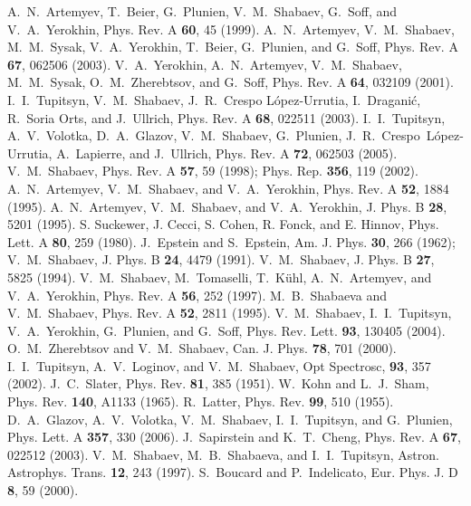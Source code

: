 \documentclass[preprint,aps,pra,showpacs,floatfix]{revtex4}
\begin{document}
\begin{thebibliography}{99}
A.~N.~Artemyev, T.~Beier, G.~Plunien, V.~M.~Shabaev, G.~Soff, and V.~A.~Yerokhin,
Phys. Rev. A \textbf{60}, 45 (1999).
%
A.~N.~Artemyev, V.~M.~Shabaev, M.~M.~Sysak, V.~A.~Yerokhin, T.~Beier, G.~Plunien,
and G.~Soff,
Phys. Rev. A \textbf{67}, 062506 (2003).
%
V.~A.~Yerokhin, A.~N.~Artemyev, V.~M.~Shabaev, M.~M.~Sysak, O.~M.~Zherebtsov,
and G.~Soff,
Phys. Rev. A \textbf{64}, 032109 (2001).
%
I.~I.~Tupitsyn, V.~M.~Shabaev, J.~R.~Crespo L\'opez-Urrutia, I.~Dragani\'c, R.~Soria Orts, and J.~Ullrich,
Phys. Rev. A {\bf 68}, 022511 (2003).
%
I.~I.~Tupitsyn, A.~V.~Volotka, D.~A.~Glazov, V.~M.~Shabaev, G.~Plunien,
J.~R.~Crespo~L\'opez-Urrutia, A.~Lapierre, and J.~Ullrich,
Phys. Rev. A {\bf 72}, 062503 (2005).
%
V.~M.~Shabaev,
Phys. Rev. A {\bf 57}, 59 (1998); Phys. Rep. {\bf 356}, 119 (2002).
%
A.~N.~Artemyev, V.~M.~Shabaev, and V.~A.~Yerokhin,
Phys. Rev. A {\bf 52}, 1884 (1995).
%
A.~N.~Artemyev, V.~M.~Shabaev, and V.~A.~Yerokhin,
J. Phys. B \textbf{28}, 5201 (1995).
%
S. Suckewer, J. Cecci, S. Cohen, R. Fonck, and E. Hinnov,
Phys. Lett. A {\bf 80}, 259 (1980).
%
J.~Epstein and S.~Epstein,
Am. J. Phys.  {\bf 30}, 266 (1962);
V.~M.~Shabaev,
J. Phys. B {\bf 24}, 4479 (1991).
%
V.~M.~Shabaev,
J. Phys. B {\bf 27}, 5825 (1994).
%
V.~M.~Shabaev, M.~Tomaselli, T.~K\"{u}hl, A.~N.~Artemyev, and V.~A.~Yerokhin,
Phys. Rev. A {\bf 56}, 252 (1997).
%
M.~B.~Shabaeva and V.~M.~Shabaev,
Phys. Rev. A {\bf 52}, 2811 (1995).
%
V.~M.~Shabaev, I.~I.~Tupitsyn, V.~A.~Yerokhin, G.~Plunien, and G.~Soff,
Phys. Rev. Lett. {\bf 93}, 130405 (2004).
%
O.~M.~Zherebtsov and V.~M.~Shabaev,
Can. J. Phys. {\bf 78}, 701 (2000).
%
I.~I.~Tupitsyn, A.~V.~Loginov, and V.~M.~Shabaev,
Opt Spectrosc, {\bf 93}, 357 (2002).
%
J.~C.~Slater,
Phys. Rev. {\bf 81}, 385 (1951).
%
W.~Kohn and L.~J.~Sham,
Phys. Rev. {\bf 140}, A1133 (1965).
%
R.~Latter,
Phys. Rev. {\bf 99}, 510 (1955).
%
D.~A.~Glazov, A.~V.~Volotka, V.~M.~Shabaev, I.~I.~Tupitsyn, and G.~Plunien,
Phys. Lett. A {\bf 357}, 330 (2006).
%
J.~Sapirstein and K.~T.~Cheng,
Phys. Rev. A  {\bf 67}, 022512 (2003).
%
V.~M.~Shabaev, M.~B.~Shabaeva, and I.~I.~Tupitsyn,
Astron. Astrophys. Trans. {\bf 12}, 243 (1997).
%
S.~Boucard and P.~Indelicato, Eur. Phys. J. D {\bf 8}, 59 (2000).
%
\end{thebibliography}
%
\end{document}
